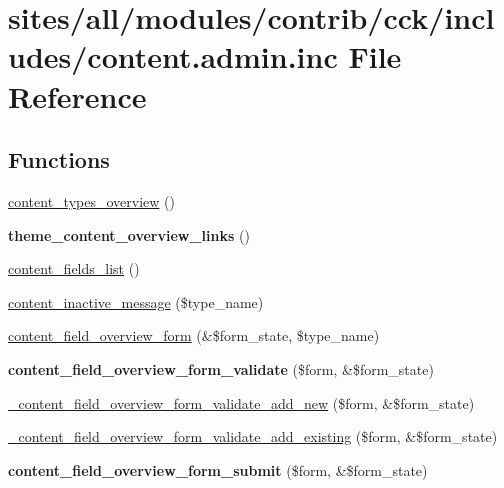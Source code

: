 \hypertarget{content_8admin_8inc}{
\section{sites/all/modules/contrib/cck/includes/content.admin.inc File Reference}
\label{content_8admin_8inc}
}
\subsection*{Functions}
\begin{CompactItemize}
\item 
\hyperlink{content_8admin_8inc_403bc800fc53cc13cc91bbfb91c66796}{content\_\-types\_\-overview} ()
\item 
\hypertarget{content_8admin_8inc_f82b0af5e0f321518b58890c6b017e15}{
\textbf{theme\_\-content\_\-overview\_\-links} ()}
\label{content_8admin_8inc_f82b0af5e0f321518b58890c6b017e15}

\item 
\hyperlink{content_8admin_8inc_4f71fc01bb4fd818b845a67057f99cdd}{content\_\-fields\_\-list} ()
\item 
\hyperlink{content_8admin_8inc_69f92512e67ab69fcb28c5efabaa4fef}{content\_\-inactive\_\-message} (\$type\_\-name)
\item 
\hyperlink{content_8admin_8inc_ba934288bcc7dbc391d708cd023b56f4}{content\_\-field\_\-overview\_\-form} (\&\$form\_\-state, \$type\_\-name)
\item 
\hypertarget{content_8admin_8inc_d0a8016a0b4f3c5575498c6b6269ac10}{
\textbf{content\_\-field\_\-overview\_\-form\_\-validate} (\$form, \&\$form\_\-state)}
\label{content_8admin_8inc_d0a8016a0b4f3c5575498c6b6269ac10}

\item 
\hyperlink{content_8admin_8inc_ade74b511a0b22fa08538659e19cf819}{\_\-content\_\-field\_\-overview\_\-form\_\-validate\_\-add\_\-new} (\$form, \&\$form\_\-state)
\item 
\hyperlink{content_8admin_8inc_3888686d98b55339e0d7f2cf931fef06}{\_\-content\_\-field\_\-overview\_\-form\_\-validate\_\-add\_\-existing} (\$form, \&\$form\_\-state)
\item 
\hypertarget{content_8admin_8inc_8e5481579835b02d7ea4f5870f3a9b91}{
\textbf{content\_\-field\_\-overview\_\-form\_\-submit} (\$form, \&\$form\_\-state)}
\label{content_8admin_8inc_8e5481579835b02d7ea4f5870f3a9b91}


\end{CompactItemize}
